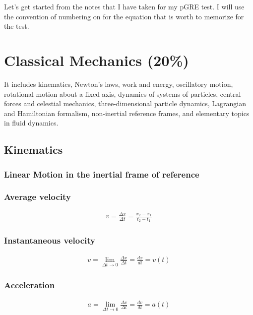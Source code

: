 \documentclass[12pt,a4paper]{article}
\begin{document}
Let's get started from the notes that I have taken for my pGRE test. I will use the convention of numbering on for the equation that is worth to memorize for the test.

\section{Classical Mechanics (20\%)}

It includes kinematics, Newton's laws, work and energy, oscillatory motion, rotational motion about a fixed axis, dynamics of systems of particles, central forces and celestial mechanics, three-dimensional particle dynamics, Lagrangian and Hamiltonian formalism, non-inertial reference frames, and elementary topics in fluid dynamics.

\subsection{Kinematics}

\subsubsection{Linear Motion in the inertial frame of reference}

\subsubsection*{Average velocity}
\begin{align*}
v = \frac{\Delta x}{\Delta t} = \frac{x_{2} - x_{1}}{t_{2} - t_{1}}
\end{align*}

\subsubsection*{Instantaneous velocity}
\begin{align*}
v = \lim_{\Delta t \to 0} \frac{\Delta x}{\Delta t} = \frac{dx}{dt} = v(t)
\end{align*}

\subsubsection*{Acceleration}
\begin{align*}
a = \lim_{\Delta t \to 0} \frac{\Delta v}{\Delta t} = \frac{dv}{dt} = a(t)
\end{align*}
\end{document}
